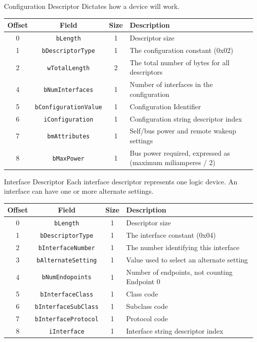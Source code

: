 \documentclass[pdf]{beamer}
\begin{document}
\begin{frame}{Configuration Descriptor}
  Dictates how a device will work.
  \begin{table}
    \tiny
    \begin{tabular}{| c | c | c | l |}
      \hline
      \textbf{Offset} & \textbf{Field} & \textbf{Size} & \textbf{Description} \\ \hline \hline
      0 & \texttt{bLength} & 1 & Descriptor size \\ \hline
      1 & \texttt{bDescriptorType} & 1 & The configuration constant (0x02) \\ \hline
      2 & \texttt{wTotalLength} & 2 & The total number of bytes for all descriptors \\ \hline
      4 & \texttt{bNumInterfaces} & 1 & Number of interfaces in the configuration \\ \hline
      5 & \texttt{bConfigurationValue} & 1 & Configuration Identifier \\ \hline
      6 & \texttt{iConfiguration} & 1 & Configuration string descriptor index \\ \hline
      7 & \texttt{bmAttributes} & 1 & Self/bus power and remote wakeup settings \\ \hline
      8 & \texttt{bMaxPower} & 1 & Bus power required, expressed as (maximum miliamperes / 2) \\ \hline
    \end{tabular}
  \end{table}
\end{frame}

\begin{frame}{Interface Descriptor}
  Each interface descriptor represents one logic device.
  An interface can have one or more alternate settings.
  \begin{table}
    \tiny
    \begin{tabular}{| c | c | c | l |}
      \hline
      \textbf{Offset} & \textbf{Field} & \textbf{Size} & \textbf{Description} \\ \hline \hline
      0 & \texttt{bLength} & 1 & Descriptor size \\ \hline
      1 & \texttt{bDescriptorType} & 1 & The interface constant (0x04) \\ \hline
      2 & \texttt{bInterfaceNumber} & 1 & The number identifying this interface \\ \hline
      3 & \texttt{bAlternateSetting} & 1 & Value used to select an alternate setting \\ \hline
      4 & \texttt{bNumEndopoints} & 1 & Number of endpoints, not counting Endpoint 0 \\ \hline
      5 & \texttt{bInterfaceClass} & 1 & Class code \\ \hline
      6 & \texttt{bInterfaceSubClass} & 1 & Subclass code \\ \hline
      7 & \texttt{bInterfaceProtocol} & 1 & Protocol code \\ \hline
      8 & \texttt{iInterface} & 1 & Interface string descriptor index \\ \hline
    \end{tabular}
  \end{table}
\end{frame}
\end{document}
